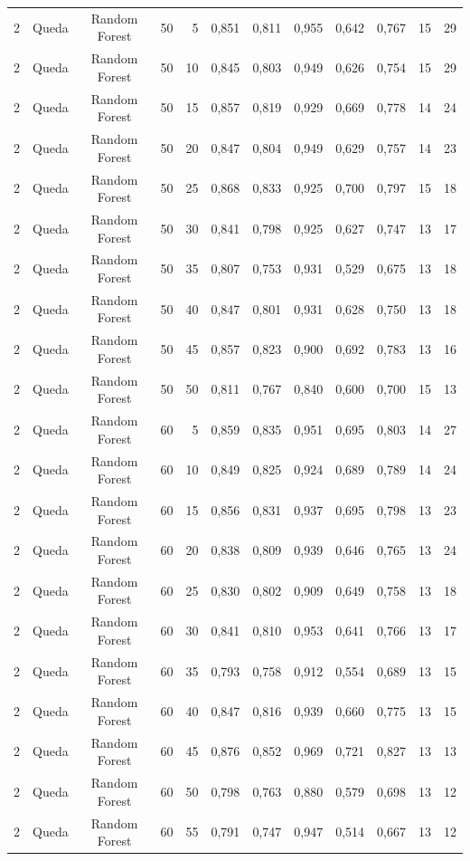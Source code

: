 \begin{longtable}{ccclrrrrrrrr}
2 & Queda & Random Forest & 50 & 5 & 0,851 & 0,811 & 0,955 & 0,642 & 0,767 & 15 & 29 \\
2 & Queda & Random Forest & 50 & 10 & 0,845 & 0,803 & 0,949 & 0,626 & 0,754 & 15 & 29 \\
2 & Queda & Random Forest & 50 & 15 & 0,857 & 0,819 & 0,929 & 0,669 & 0,778 & 14 & 24 \\
2 & Queda & Random Forest & 50 & 20 & 0,847 & 0,804 & 0,949 & 0,629 & 0,757 & 14 & 23 \\
2 & Queda & Random Forest & 50 & 25 & 0,868 & 0,833 & 0,925 & 0,700 & 0,797 & 15 & 18 \\
2 & Queda & Random Forest & 50 & 30 & 0,841 & 0,798 & 0,925 & 0,627 & 0,747 & 13 & 17 \\
2 & Queda & Random Forest & 50 & 35 & 0,807 & 0,753 & 0,931 & 0,529 & 0,675 & 13 & 18 \\
2 & Queda & Random Forest & 50 & 40 & 0,847 & 0,801 & 0,931 & 0,628 & 0,750 & 13 & 18 \\
2 & Queda & Random Forest & 50 & 45 & 0,857 & 0,823 & 0,900 & 0,692 & 0,783 & 13 & 16 \\
2 & Queda & Random Forest & 50 & 50 & 0,811 & 0,767 & 0,840 & 0,600 & 0,700 & 15 & 13 \\
2 & Queda & Random Forest & 60 & 5 & 0,859 & 0,835 & 0,951 & 0,695 & 0,803 & 14 & 27 \\
2 & Queda & Random Forest & 60 & 10 & 0,849 & 0,825 & 0,924 & 0,689 & 0,789 & 14 & 24 \\
2 & Queda & Random Forest & 60 & 15 & 0,856 & 0,831 & 0,937 & 0,695 & 0,798 & 13 & 23 \\
2 & Queda & Random Forest & 60 & 20 & 0,838 & 0,809 & 0,939 & 0,646 & 0,765 & 13 & 24 \\
2 & Queda & Random Forest & 60 & 25 & 0,830 & 0,802 & 0,909 & 0,649 & 0,758 & 13 & 18 \\
2 & Queda & Random Forest & 60 & 30 & 0,841 & 0,810 & 0,953 & 0,641 & 0,766 & 13 & 17 \\
2 & Queda & Random Forest & 60 & 35 & 0,793 & 0,758 & 0,912 & 0,554 & 0,689 & 13 & 15 \\
2 & Queda & Random Forest & 60 & 40 & 0,847 & 0,816 & 0,939 & 0,660 & 0,775 & 13 & 15 \\
2 & Queda & Random Forest & 60 & 45 & 0,876 & 0,852 & 0,969 & 0,721 & 0,827 & 13 & 13 \\
2 & Queda & Random Forest & 60 & 50 & 0,798 & 0,763 & 0,880 & 0,579 & 0,698 & 13 & 12 \\
2 & Queda & Random Forest & 60 & 55 & 0,791 & 0,747 & 0,947 & 0,514 & 0,667 & 13 & 12 \\

\end{longtable}
